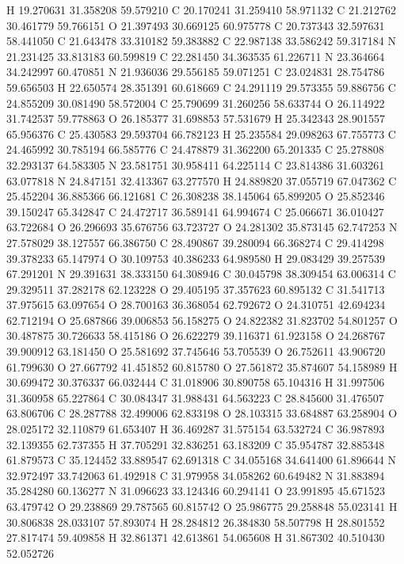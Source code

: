\documentclass{article}
\begin{document}
H 19.270631 31.358208 59.579210
C 20.170241 31.259410 58.971132
C 21.212762 30.461779 59.766151
O 21.397493 30.669125 60.975778
C 20.737343 32.597631 58.441050
C 21.643478 33.310182 59.383882
C 22.987138 33.586242 59.317184
N 21.231425 33.813183 60.599819
C 22.281450 34.363535 61.226711
N 23.364664 34.242997 60.470851
N 21.936036 29.556185 59.071251
C 23.024831 28.754786 59.656503
H 22.650574 28.351391 60.618669
C 24.291119 29.573355 59.886756
C 24.855209 30.081490 58.572004
C 25.790699 31.260256 58.633744
O 26.114922 31.742537 59.778863
O 26.185377 31.698853 57.531679
H 25.342343 28.901557 65.956376
C 25.430583 29.593704 66.782123
H 25.235584 29.098263 67.755773
C 24.465992 30.785194 66.585776
C 24.478879 31.362200 65.201335
C 25.278808 32.293137 64.583305
N 23.581751 30.958411 64.225114
C 23.814386 31.603261 63.077818
N 24.847151 32.413367 63.277570
H 24.889820 37.055719 67.047362
C 25.452204 36.885366 66.121681
C 26.308238 38.145064 65.899205
O 25.852346 39.150247 65.342847
C 24.472717 36.589141 64.994674
C 25.066671 36.010427 63.722684
O 26.296693 35.676756 63.723727
O 24.281302 35.873145 62.747253
N 27.578029 38.127557 66.386750
C 28.490867 39.280094 66.368274
C 29.414298 39.378233 65.147974
O 30.109753 40.386233 64.989580
H 29.083429 39.257539 67.291201
N 29.391631 38.333150 64.308946
C 30.045798 38.309454 63.006314
C 29.329511 37.282178 62.123228
O 29.405195 37.357623 60.895132
C 31.541713 37.975615 63.097654
O 28.700163 36.368054 62.792672
O 24.310751 42.694234 62.712194
O 25.687866 39.006853 56.158275
O 24.822382 31.823702 54.801257
O 30.487875 30.726633 58.415186
O 26.622279 39.116371 61.923158
O 24.268767 39.900912 63.181450
O 25.581692 37.745646 53.705539
O 26.752611 43.906720 61.799630
O 27.667792 41.451852 60.815780
O 27.561872 35.874607 54.158989
H 30.699472 30.376337 66.032444
C 31.018906 30.890758 65.104316
H 31.997506 31.360958 65.227864
C 30.084347 31.988431 64.563223
C 28.845600 31.476507 63.806706
C 28.287788 32.499006 62.833198
O 28.103315 33.684887 63.258904
O 28.025172 32.110879 61.653407
H 36.469287 31.575154 63.532724
C 36.987893 32.139355 62.737355
H 37.705291 32.836251 63.183209
C 35.954787 32.885348 61.879573
C 35.124452 33.889547 62.691318
C 34.055168 34.641400 61.896644
N 32.972497 33.742063 61.492918
C 31.979958 34.058262 60.649482
N 31.883894 35.284280 60.136277
N 31.096623 33.124346 60.294141
O 23.991895 45.671523 63.479742
O 29.238869 29.787565 60.815742
O 25.986775 29.258848 55.023141
H 30.806838 28.033107 57.893074
H 28.284812 26.384830 58.507798
H 28.801552 27.817474 59.409858
H 32.861371 42.613861 54.065608
H 31.867302 40.510430 52.052726
\end{document}

